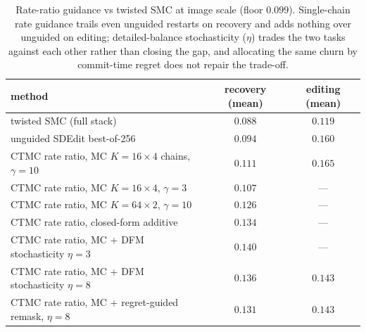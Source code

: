 \documentclass[11pt]{article}
\begin{document}
\begin{table}[h]
\centering\small
\begin{tabular}{lcc}
\toprule
method & recovery (mean) & editing (mean) \\
\midrule
twisted SMC (full stack)        & $\mathbf{0.088}$ & $\mathbf{0.119}$ \\
unguided SDEdit best-of-256     & $0.094$ & $0.160$ \\
CTMC rate ratio, MC $K{=}16{\times}4$ chains, $\gamma{=}10$ & $0.111$ & $0.165$ \\
CTMC rate ratio, MC $K{=}16{\times}4$, $\gamma{=}3$  & $0.107$ & --- \\
CTMC rate ratio, MC $K{=}64{\times}2$, $\gamma{=}10$ & $0.126$ & --- \\
CTMC rate ratio, closed-form additive & $0.134$ & --- \\
CTMC rate ratio, MC + DFM stochasticity $\eta{=}3$ & $0.140$ & --- \\
CTMC rate ratio, MC + DFM stochasticity $\eta{=}8$ & $0.136$ & $0.143$ \\
CTMC rate ratio, MC + regret-guided remask, $\eta{=}8$ & $0.131$ & $0.143$ \\
\bottomrule
\end{tabular}
\caption{Rate-ratio guidance vs twisted SMC at image scale (floor
$0.099$). Single-chain rate guidance trails even unguided restarts on
recovery and adds nothing over unguided on editing; detailed-balance
stochasticity ($\eta$) trades the two tasks against each other rather
than closing the gap, and allocating the same churn by commit-time
regret does not repair the trade-off.}
\end{table}
\end{document}
